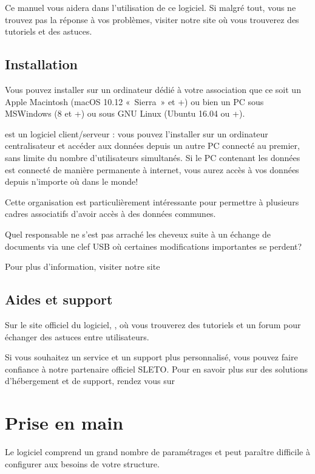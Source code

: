 \documentclass[a4paper,10pt,oneside,french]{sphinxmanual}
\begin{document}
Ce manuel vous aidera dans l’utilisation de ce logiciel.
Si malgré tout, vous ne trouvez pas la réponse à vos problèmes, visiter notre site  où vous trouverez des tutoriels et des astuces.


\subsection{Installation}
\label{\detokenize{asso/presentation:installation}}
Vous pouvez installer  sur un ordinateur dédié à votre association que ce soit un Apple Macintosh (macOS 10.12 « Sierra » et +) ou bien un PC sous MS\sphinxhyphen{}Windows (8 et +) ou sous GNU Linux (Ubuntu 16.04 ou +).

 est un logiciel client/serveur : vous pouvez l’installer sur un ordinateur centralisateur et accéder aux données depuis un autre PC connecté au premier, sans limite du nombre d’utilisateurs simultanés.
Si le PC contenant les données est connecté de manière permanente à internet, vous aurez accès à vos données depuis n’importe où dans le monde!

Cette organisation est particulièrement intéressante pour permettre à plusieurs cadres associatifs d’avoir accès à des données communes.

Quel responsable ne s’est pas arraché les cheveux suite à un échange de documents via une clef USB où certaines modifications importantes se perdent?

Pour plus d’information, visiter notre site 


\subsection{Aides et support}
\label{\detokenize{asso/presentation:aides-et-support}}
Sur le site officiel du logiciel, , où vous trouverez des tutoriels et un forum pour échanger des astuces entre utilisateurs.

Si vous souhaitez un service et un support plus personnalisé, vous pouvez faire confiance à notre partenaire officiel SLETO.
Pour en savoir plus sur des solutions d’hébergement et de support, rendez vous sur 


\section{Prise en main}
\label{\detokenize{asso/first_step:prise-en-main}}\label{\detokenize{asso/first_step::doc}}
Le logiciel  comprend un grand nombre de paramétrages et peut paraître difficile à configurer aux besoins de votre structure.
\end{document}
